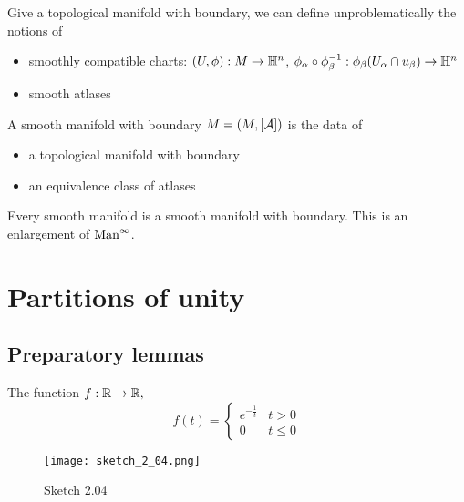 Give a topological manifold with boundary, we can define unproblematically the notions of 
\begin{itemize}
    \item smoothly compatible charts: \((U,\phi):M\to\mathbb{H}^n\), \(\phi_\alpha\circ \phi_\beta^{-1}:\phi_\beta(U_\alpha\cap u_\beta)\to\mathbb{H}^n\)
    \item smooth atlases
\end{itemize}

\begin{definition*}
    A smooth manifold with boundary \(M=(M,[\mathcal{A}])\) is the data of 
    \begin{itemize}
        \item a topological manifold with boundary 
        \item an equivalence class of atlases 
    \end{itemize}    
\end{definition*}

\begin{remark}
    Every smooth manifold is a smooth manifold with boundary. This is an enlargement of 
    \(\text{Man}^\infty\).
\end{remark}

\section{Partitions of unity}

\subsection{Preparatory lemmas}

\begin{lemma}\label{lem:2.4}
    The function \(f:\mathbb{R}\to\mathbb{R},\)
    \[f(t)=\begin{cases}
        e^{-\frac{1}{t}} & t>0\\
        0 & t\leq 0
    \end{cases}\]
\end{lemma}

\begin{figure}[H]
    \centering
    \texttt{[image: sketch\_2\_04.png]}
    \caption{Sketch 2.04}
\end{figure}

